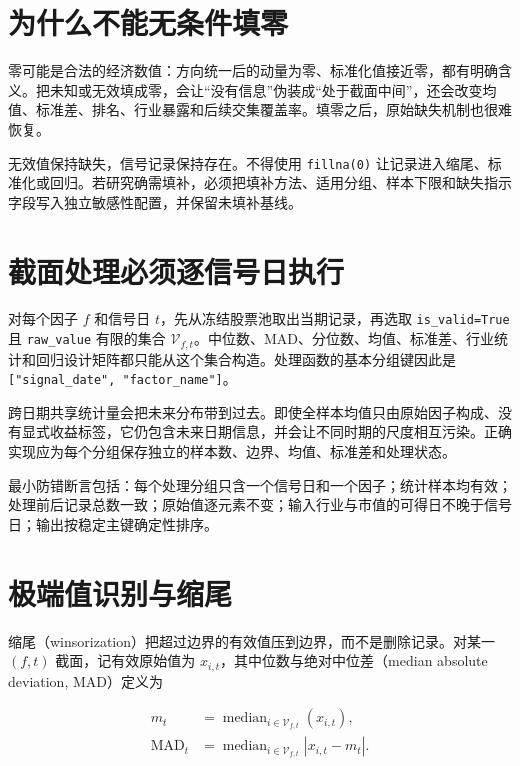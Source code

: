 \section{为什么不能无条件填零}

零可能是合法的经济数值：方向统一后的动量为零、标准化值接近零，都有明确含义。把未知或无效填成零，会让“没有信息”伪装成“处于截面中间”，还会改变均值、标准差、排名、行业暴露和后续交集覆盖率。填零之后，原始缺失机制也很难恢复。

\begin{warningbox}
无效值保持缺失，信号记录保持存在。不得使用
\texttt{fillna(0)} 让记录进入缩尾、标准化或回归。若研究确需填补，必须把填补方法、适用分组、样本下限和缺失指示字段写入独立敏感性配置，并保留未填补基线。
\end{warningbox}

\section{截面处理必须逐信号日执行}

对每个因子 \(f\) 和信号日 \(t\)，先从冻结股票池取出当期记录，再选取
\texttt{is\_valid=True} 且 \texttt{raw\_value} 有限的集合
\(\mathcal{V}_{f,t}\)。中位数、MAD、分位数、均值、标准差、行业统计和回归设计矩阵都只能从这个集合构造。处理函数的基本分组键因此是
\texttt{["signal\_date", "factor\_name"]}。

跨日期共享统计量会把未来分布带到过去。即使全样本均值只由原始因子构成、没有显式收益标签，它仍包含未来日期信息，并会让不同时期的尺度相互污染。正确实现应为每个分组保存独立的样本数、边界、均值、标准差和处理状态。

\begin{practicebox}
最小防错断言包括：每个处理分组只含一个信号日和一个因子；统计样本均有效；处理前后记录总数一致；原始值逐元素不变；输入行业与市值的可得日不晚于信号日；输出按稳定主键确定性排序。
\end{practicebox}

\section{极端值识别与缩尾}

缩尾（winsorization）把超过边界的有效值压到边界，而不是删除记录。对某一
\((f,t)\) 截面，记有效原始值为 \(x_{i,t}\)，其中位数与绝对中位差（median absolute deviation, MAD）定义为

\begin{align}
  m_t
  &=
  \operatorname{median}_{i\in\mathcal{V}_{f,t}}
  \left(x_{i,t}\right),
  \label{eq:ch05-median}\\
  \mathrm{MAD}_t
  &=
  \operatorname{median}_{i\in\mathcal{V}_{f,t}}
  \left|x_{i,t}-m_t\right|.
  \label{eq:ch05-mad}
\end{align}

